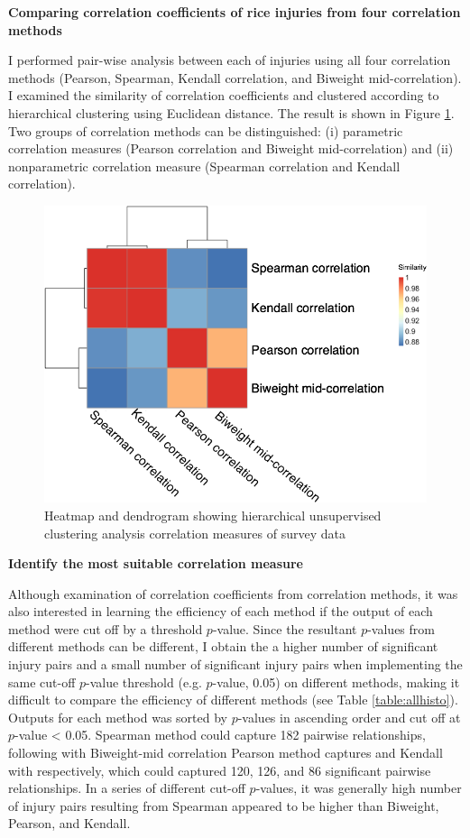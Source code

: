 \textbf{Comparing correlation coefficients of rice injuries from four correlation methods }

I performed pair-wise analysis between each of injuries using all four correlation methods (Pearson, Spearman, Kendall correlation, and Biweight mid-correlation). I examined the similarity of correlation coefficients and clustered according to hierarchical clustering using Euclidean distance. The result is shown in Figure \ref{fig:heatmap}. Two groups of correlation methods can be distinguished: (i) parametric correlation measures (Pearson correlation and Biweight mid-correlation) and (ii) nonparametric correlation measure (Spearman correlation and Kendall correlation).
\begin{figure}[!h]
\centering
\includegraphics[width = 1\textwidth]{figures/heatmap/heatmap.png}
\caption{Heatmap and dendrogram showing hierarchical unsupervised clustering analysis correlation measures of survey data}
\label{fig:heatmap}
\end{figure}

\textbf{Identify the most suitable correlation measure}

Although examination of correlation coefficients from correlation methods, it was also interested in learning the efficiency of each method if the output of each method were cut off by a threshold $p$-value. Since the resultant $p$-values from different methods can be different, I obtain the a higher number of significant injury pairs and a small number of significant injury pairs when implementing the same cut-off $p$-value threshold (e.g. $p$-value, 0.05) on different methods, making it difficult to compare the efficiency of different methods (see Table \ref{table:allhisto}). Outputs for each method was sorted by $p$-values in ascending order and cut off at $p$-value < 0.05.  Spearman method could capture 182 pairwise relationships, following with Biweight-mid correlation Pearson method captures and Kendall with respectively, which could captured 120, 126, and 86 significant pairwise relationships. In a series of different cut-off $p$-values, it was generally high number of injury pairs resulting from Spearman appeared to be higher than Biweight, Pearson, and Kendall.

